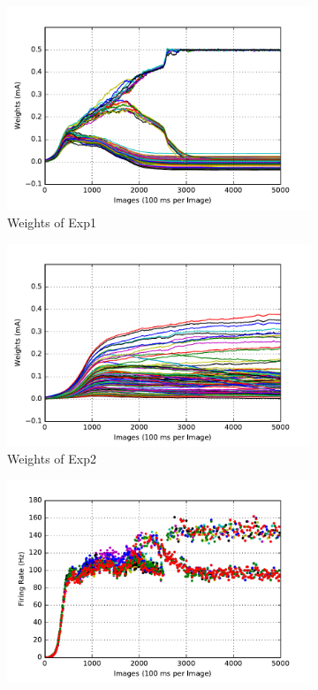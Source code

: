 \begin{figure}
	\centering
	\begin{subfigure}[t]{0.4\textwidth}
		\includegraphics[width=\textwidth]{pics_sdlm/15_exp_SRBM_teach_long/exp1_weights_s.pdf}
		\caption{Weights of Exp1}
	\end{subfigure}
	\begin{subfigure}[t]{0.4\textwidth}
		\includegraphics[width=\textwidth]{pics_sdlm/15_exp_SRBM_teach_long/exp2_weights_s.pdf}
		\caption{Weights of Exp2}
	\end{subfigure}
	\begin{subfigure}[t]{0.4\textwidth}
		\includegraphics[width=\textwidth]{pics_sdlm/15_exp_SRBM_teach_long/exp1_recon_s.pdf}

\end{subfigure}
\end{figure}
